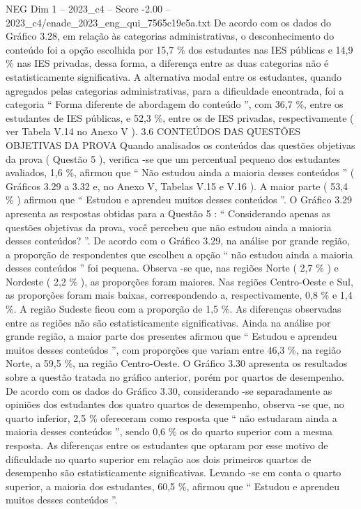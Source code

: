 \begin{textsample}{NEG Dim 1 – 2023\_c4 – Score -2.00 – 2023\_c4/enade\_2023\_eng\_qui\_7565c19e5a.txt}
De acordo com os dados do Gráfico 3.28, em relação às categorias administrativas, o desconhecimento do conteúdo foi a opção escolhida por 15,7 \% dos estudantes nas IES públicas e 14,9 \% nas IES privadas, dessa forma, a diferença entre as duas categorias não é estatisticamente significativa.
A alternativa modal entre os estudantes, quando agregados pelas categorias administrativas, para a dificuldade encontrada, foi a categoria “ Forma diferente de abordagem do conteúdo ”, com 36,7 \%, entre os estudantes de IES públicas, e 52,3 \%, entre os de IES privadas, respectivamente ( ver Tabela V.14 no Anexo V ). 3.6 CONTEÚDOS DAS QUESTÕES OBJETIVAS DA PROVA Quando analisados os conteúdos das questões objetivas da prova ( Questão 5 ), verifica -se que um percentual pequeno dos estudantes avaliados, 1,6 \%, afirmou que “ Não estudou ainda a maioria desses conteúdos ” ( Gráficos 3.29 a 3.32 e, no Anexo V, Tabelas V.15 e V.16 ).
A maior parte ( 53,4 \% ) afirmou que “ Estudou e aprendeu muitos desses conteúdos ”.
O Gráfico 3.29 apresenta as respostas obtidas para a Questão 5 : “ Considerando apenas as questões objetivas da prova, você percebeu que não estudou ainda a maioria desses conteúdos? ”.
De acordo com o Gráfico 3.29, na análise por grande região, a proporção de respondentes que escolheu a opção “ não estudou ainda a maioria desses conteúdos ” foi pequena.
Observa -se que, nas regiões Norte ( 2,7 \% ) e Nordeste ( 2,2 \% ), as proporções foram maiores.
Nas regiões Centro-Oeste e Sul, as proporções foram mais baixas, correspondendo a, respectivamente, 0,8 \% e 1,4 \%.
A região Sudeste ficou com a proporção de 1,5 \%.
As diferenças observadas entre as regiões não são estatisticamente significativas.
Ainda na análise por grande região, a maior parte dos presentes afirmou que “ Estudou e aprendeu muitos desses conteúdos ”, com proporções que variam entre 46,3 \%, na região Norte, a 59,5 \%, na região Centro-Oeste.
O Gráfico 3.30 apresenta os resultados sobre a questão tratada no gráfico anterior, porém por quartos de desempenho.
De acordo com os dados do Gráfico 3.30, considerando -se separadamente as opiniões dos estudantes dos quatro quartos de desempenho, observa -se que, no quarto inferior, 2,5 \% ofereceram como resposta que “ não estudaram ainda a maioria desses conteúdos ”, sendo 0,6 \% os do quarto superior com a mesma resposta.
As diferenças entre os estudantes que optaram por esse motivo de dificuldade no quarto superior em relação aos dois primeiros quartos de desempenho são estatisticamente significativas.
Levando -se em conta o quarto superior, a maioria dos estudantes, 60,5 \%, afirmou que “ Estudou e aprendeu muitos desses conteúdos ”.

\end{textsample}
